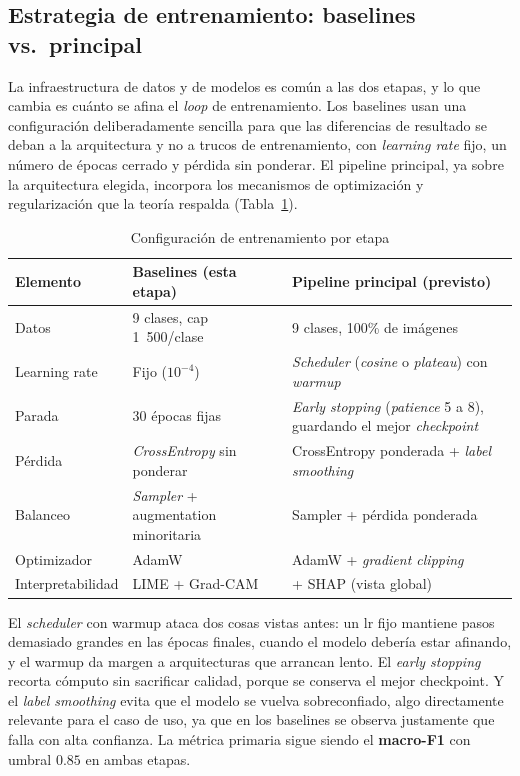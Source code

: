 \documentclass[12pt,letterpaper]{article}
\begin{document}
\subsection{Estrategia de entrenamiento: baselines vs.\ principal}
\label{sec:estrategia}

La infraestructura de datos y de modelos es com\'un a las dos etapas, y lo que cambia es cu\'anto se afina el \textit{loop} de entrenamiento. Los baselines usan una configuraci\'on deliberadamente sencilla para que las diferencias de resultado se deban a la arquitectura y no a trucos de entrenamiento, con \textit{learning rate} fijo, un n\'umero de \'epocas cerrado y p\'erdida sin ponderar. El pipeline principal, ya sobre la arquitectura elegida, incorpora los mecanismos de optimizaci\'on y regularizaci\'on que la teor\'ia respalda (Tabla~\ref{tab:estrategia}).

\begin{table}[H]
\caption{Configuraci\'on de entrenamiento por etapa}
\label{tab:estrategia}
\centering
\small
\begin{singlespace}
\begin{tabular}{p{3.0cm}p{4.0cm}p{4.5cm}}
\toprule
\textbf{Elemento} & \textbf{Baselines (esta etapa)} & \textbf{Pipeline principal (previsto)} \\
\midrule
Datos & 9 clases, cap 1~500/clase & 9 clases, 100\% de im\'agenes \\
Learning rate & Fijo ($10^{-4}$) & \textit{Scheduler} (\textit{cosine} o \textit{plateau}) con \textit{warmup} \\
Parada & 30 \'epocas fijas & \textit{Early stopping} (\textit{patience} 5 a 8), guardando el mejor \textit{checkpoint} \\
P\'erdida & \textit{CrossEntropy} sin ponderar & CrossEntropy ponderada + \textit{label smoothing} \\
Balanceo & \textit{Sampler} + augmentation minoritaria & Sampler + p\'erdida ponderada \\
Optimizador & AdamW & AdamW + \textit{gradient clipping} \\
Interpretabilidad & LIME + Grad-CAM & + SHAP (vista global) \\
\bottomrule
\end{tabular}
\end{singlespace}
\end{table}

El \textit{scheduler} con warmup ataca dos cosas vistas antes: un lr fijo mantiene pasos demasiado grandes en las \'epocas finales, cuando el modelo deber\'ia estar afinando, y el warmup da margen a arquitecturas que arrancan lento. El \textit{early stopping} recorta c\'omputo sin sacrificar calidad, porque se conserva el mejor checkpoint. Y el \textit{label smoothing} evita que el modelo se vuelva sobreconfiado, algo directamente relevante para el caso de uso, ya que en los baselines se observa justamente que falla con alta confianza. La m\'etrica primaria sigue siendo el \textbf{macro-F1} con umbral $0.85$ en ambas etapas.
\end{document}
